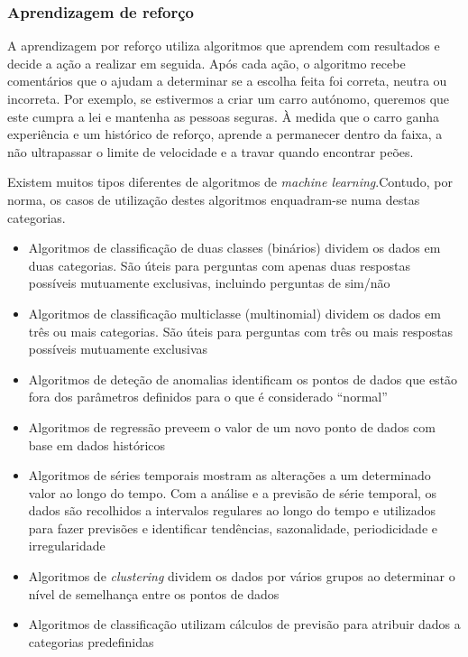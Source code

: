 \documentclass[a4paper,10pt]{article}
\begin{document}
\subsubsection{Aprendizagem de reforço}

A aprendizagem por reforço utiliza algoritmos que aprendem com resultados e decide a ação a realizar em seguida.
Após cada ação, o algoritmo recebe comentários que o ajudam a determinar se a escolha feita foi correta, neutra ou incorreta.
Por exemplo, se estivermos a criar um carro autónomo, queremos que este cumpra a lei e mantenha as pessoas seguras.
À medida que o carro ganha experiência e um histórico de reforço, aprende a permanecer dentro da faixa, a não ultrapassar o limite de velocidade e a travar quando encontrar peões.

Existem muitos tipos diferentes de algoritmos de \textit{machine learning}.Contudo, por norma, os casos de utilização destes algoritmos enquadram-se numa destas categorias.
\begin{itemize}
  \item Algoritmos de classificação de duas classes (binários) dividem os dados em duas categorias. São úteis para perguntas com apenas duas respostas possíveis mutuamente exclusivas, incluindo perguntas de sim/não
  \item Algoritmos de classificação multiclasse (multinomial) dividem os dados em três ou mais categorias. São úteis para perguntas com três ou mais respostas possíveis mutuamente exclusivas
  \item Algoritmos de deteção de anomalias identificam os pontos de dados que estão fora dos parâmetros definidos para o que é considerado ``normal''
  \item Algoritmos de regressão preveem o valor de um novo ponto de dados com base em dados históricos
  \item Algoritmos de séries temporais mostram as alterações a um determinado valor ao longo do tempo. Com a análise e a previsão de série temporal, os dados são recolhidos a intervalos regulares ao longo do tempo e utilizados para fazer previsões e identificar tendências, sazonalidade, periodicidade e irregularidade
  \item Algoritmos de \textit{clustering} dividem os dados por vários grupos ao determinar o nível de semelhança entre os pontos de dados
  \item Algoritmos de classificação utilizam cálculos de previsão para atribuir dados a categorias predefinidas
\end{itemize}
\end{document}
